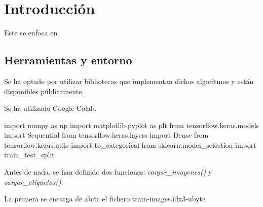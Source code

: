 \section{Introducción}
Este se enfoca en

\subsection{Herramientas y entorno}

Se ha optado por utilizar bibliotecas que implementan dichos algoritmos y están disponibles públicamente.

Se ha utilizado Google Colab.

import numpy as np
import matplotlib.pyplot as plt
from tensorflow.keras.models import Sequential
from tensorflow.keras.layers import Dense
from tensorflow.keras.utils import to\_categorical
from sklearn.model\_selection import train\_test\_split


Antes de nada, se han definido dos funciones: \textit{cargar\_imagenes()} y \textit{cargar\_etiquetas()}.

La primera se encarga de abrir el fichero train-images.idx3-ubyte
